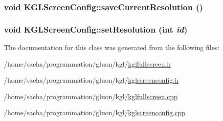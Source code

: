 \hypertarget{class_k_g_l_screen_config_ad681fe82fe2472913d9cfa0f5da5609}{
\subsubsection[{saveCurrentResolution}]{\setlength{\rightskip}{0pt plus 5cm}void KGLScreenConfig::saveCurrentResolution ()}}
\label{class_k_g_l_screen_config_ad681fe82fe2472913d9cfa0f5da5609}


\hypertarget{class_k_g_l_screen_config_a7ff79a18684faf32a608ac6d3765dd5}{
\subsubsection[{setResolution}]{\setlength{\rightskip}{0pt plus 5cm}void KGLScreenConfig::setResolution (int {\em id})}}
\label{class_k_g_l_screen_config_a7ff79a18684faf32a608ac6d3765dd5}




The documentation for this class was generated from the following files:\begin{CompactItemize}
\item 
/home/sacha/programmation/gluon/kgl/\hyperlink{kglfullscreen_8h}{kglfullscreen.h}\item 
/home/sacha/programmation/gluon/kgl/\hyperlink{kglscreenconfig_8h}{kglscreenconfig.h}\item 
/home/sacha/programmation/gluon/kgl/\hyperlink{kglfullscreen_8cpp}{kglfullscreen.cpp}\item 
/home/sacha/programmation/gluon/kgl/\hyperlink{kglscreenconfig_8cpp}{kglscreenconfig.cpp}\end{CompactItemize}
